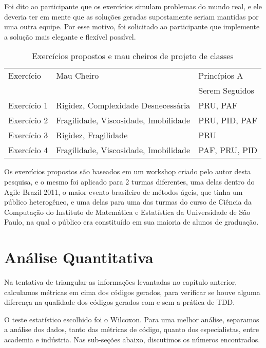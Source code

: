 \documentclass[conference]{IEEEtran}
\begin{document}
Foi dito ao participante que os exercícios simulam problemas do mundo real, e ele deveria
ter em mente que as soluções geradas supostamente seriam mantidas por uma outra equipe.
Por esse motivo, foi solicitado ao participante que implemente a solução mais elegante e flexível 
possível.

\begin{table}
	\centering
	\begin{tabular}{| l | l | l | }
		\hline
		Exercício & Mau Cheiro & Princípios A\\
		& & Serem Seguidos\\
		
		\hline
		
		Exercício 1 & Rigidez, Complexidade Desnecessária & PRU, PAF \\
		Exercício 2 & Fragilidade, Viscosidade, Imobilidade & PRU, PID, PAF \\
		Exercício 3 & Rigidez, Fragilidade & PRU\\
		Exercício 4 & Fragilidade, Viscosidade, Imobilidade & PAF, PRU, PID \\
		
		\hline
	\end{tabular}
	\caption{Exercícios propostos e mau cheiros de projeto de classes}
	\label{tab:problemas-exercicios}
\end{table}

Os exercícios propostos são baseados em um workshop criado pelo autor desta pesquisa, e o mesmo
foi aplicado para 2 turmas diferentes, uma delas dentro do Agile Brazil 2011, o
maior evento brasileiro de métodos ágeis, que tinha um público heterogêneo, e uma delas para
uma das turmas do curso de Ciência da Computação do Instituto de Matemática e Estatística da Universidade
de São Paulo, na qual o público era constituído em sua maioria de alunos de graduação. 

\section{Análise Quantitativa}

Na tentativa de triangular as informações levantadas no capítulo anterior,
calculamos métricas em cima dos códigos gerados, para verificar se houve
alguma diferença na qualidade dos códigos gerados com e sem a prática de TDD.

O teste estatístico escolhido foi o Wilcoxon. 
Para uma melhor análise, separamos a análise
dos dados, tanto das métricas de código, quanto dos especialistas, entre academia e indústria.
Nas sub-seções abaixo, discutimos os números encontrados.
\end{document}
